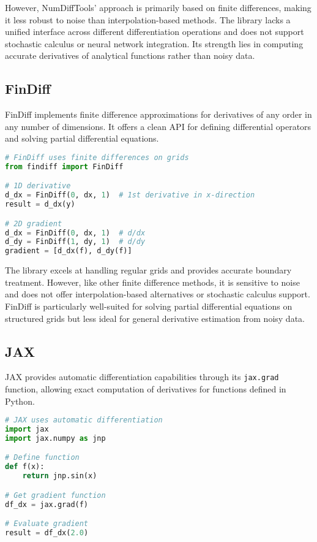 \documentclass[11pt,a4paper]{article}
\begin{document}
However, NumDiffTools' approach is primarily based on finite differences, making it less robust to noise than interpolation-based methods. The library lacks a unified interface across different differentiation operations and does not support stochastic calculus or neural network integration. Its strength lies in computing accurate derivatives of analytical functions rather than noisy data.

\subsection{FinDiff}

FinDiff \citep{findiff} implements finite difference approximations for derivatives of any order in any number of dimensions. It offers a clean API for defining differential operators and solving partial differential equations.

\begin{lstlisting}[language=Python, caption=FinDiff example]
# FinDiff uses finite differences on grids
from findiff import FinDiff

# 1D derivative
d_dx = FinDiff(0, dx, 1)  # 1st derivative in x-direction
result = d_dx(y)

# 2D gradient
d_dx = FinDiff(0, dx, 1)  # d/dx
d_dy = FinDiff(1, dy, 1)  # d/dy
gradient = [d_dx(f), d_dy(f)]
\end{lstlisting}

The library excels at handling regular grids and provides accurate boundary treatment. However, like other finite difference methods, it is sensitive to noise and does not offer interpolation-based alternatives or stochastic calculus support. FinDiff is particularly well-suited for solving partial differential equations on structured grids but less ideal for general derivative estimation from noisy data.

\subsection{JAX}

JAX \citep{jax2018github} provides automatic differentiation capabilities through its \texttt{jax.grad} function, allowing exact computation of derivatives for functions defined in Python.

\begin{lstlisting}[language=Python, caption=JAX automatic differentiation example]
# JAX uses automatic differentiation
import jax
import jax.numpy as jnp

# Define function
def f(x):
    return jnp.sin(x)

# Get gradient function
df_dx = jax.grad(f)

# Evaluate gradient
result = df_dx(2.0)
\end{lstlisting}
\end{document}

